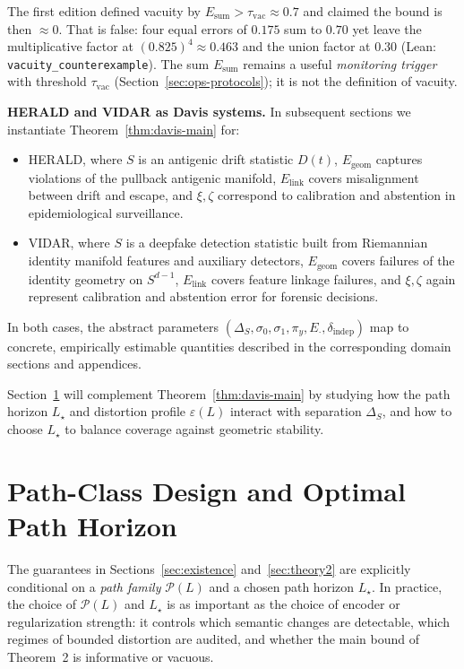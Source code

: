\documentclass[11pt]{article}
\theoremstyle{remark}
\theoremstyle{plain}
\begin{document}
The first edition defined vacuity by $E_{\mathrm{sum}} > \tau_{\mathrm{vac}} \approx 0.7$ and claimed the bound is then
$\approx 0$. That is false: four equal errors of $0.175$ sum to $0.70$ yet leave the multiplicative factor at
$(0.825)^4 \approx 0.463$ and the union factor at $0.30$ (Lean: \texttt{vacuity\_counterexample}). The sum
$E_{\mathrm{sum}}$ remains a useful \emph{monitoring trigger} with threshold $\tau_{\mathrm{vac}}$ (Section~\ref{sec:ops-protocols});
it is not the definition of vacuity.

\medskip
\noindent\textbf{HERALD and VIDAR as Davis systems.}
In subsequent sections we instantiate Theorem~\ref{thm:davis-main} for:
\begin{itemize}[leftmargin=2em]
  \item HERALD, where $S$ is an antigenic drift statistic $D(t)$, $E_{\mathrm{geom}}$ captures
    violations of the pullback antigenic manifold, $E_{\mathrm{link}}$ covers misalignment between
    drift and escape, and $\xi,\zeta$ correspond to calibration and abstention in epidemiological
    surveillance.

  \item VIDAR, where $S$ is a deepfake detection statistic built from Riemannian identity
    manifold features and auxiliary detectors, $E_{\mathrm{geom}}$ covers failures of the identity
    geometry on $S^{d-1}$, $E_{\mathrm{link}}$ covers feature linkage failures, and $\xi,\zeta$ again
    represent calibration and abstention error for forensic decisions.
\end{itemize}

In both cases, the abstract parameters $(\Delta_S,\sigma_0,\sigma_1,\pi_y,E_{\cdot},\delta_{\mathrm{indep}})$
map to concrete, empirically estimable quantities described in the corresponding domain sections
and appendices.

\medskip
Section~\ref{sec:path-optimization} will complement Theorem~\ref{thm:davis-main} by studying
how the path horizon $L_\star$ and distortion profile $\varepsilon(L)$ interact with separation
$\Delta_S$, and how to choose $L_\star$ to balance coverage against geometric stability.

\section{Path-Class Design and Optimal Path Horizon}
\label{sec:path-optimization}

The guarantees in Sections~\ref{sec:existence} and~\ref{sec:theory2} are explicitly conditional on a
\emph{path family} $\mathcal{P}(L)$ and a chosen path horizon $L_\star$. In practice, the choice of
$\mathcal{P}(L)$ and $L_\star$ is as important as the choice of encoder or regularization strength:
it controls which semantic changes are detectable, which regimes of bounded distortion are audited,
and whether the main bound of Theorem~2 is informative or vacuous.
\end{document}
